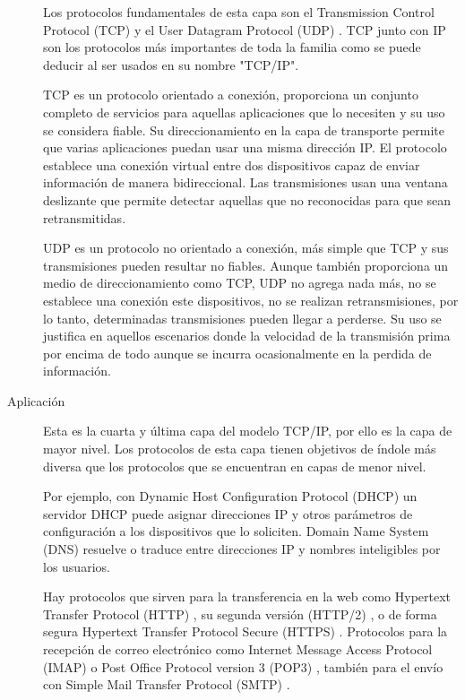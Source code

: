 \begin{description}
  Los protocolos fundamentales de esta capa son el Transmission Control Protocol
  (TCP) \cite{rfc793} y el User Datagram Protocol (UDP) \cite{rfc768}.
  TCP junto con IP son los protocolos más importantes de toda la familia como se
  puede deducir al ser usados en su nombre "TCP/IP".

  TCP es un protocolo orientado a conexión, proporciona un conjunto completo de
  servicios para aquellas aplicaciones que lo necesiten y su uso se considera
  fiable. Su direccionamiento en la capa de transporte permite que varias
  aplicaciones puedan usar una misma dirección IP. El protocolo establece una
  conexión virtual entre dos dispositivos capaz de enviar información de manera
  bidireccional. Las transmisiones usan una ventana deslizante que permite
  detectar aquellas que no reconocidas para que sean retransmitidas.

  UDP es un protocolo no orientado a conexión, más simple que TCP y sus
  transmisiones pueden resultar no fiables. Aunque también proporciona un medio
  de direccionamiento como TCP, UDP no agrega nada más, no se establece una
  conexión este dispositivos, no se realizan retransmisiones, por lo tanto,
  determinadas transmisiones pueden llegar a perderse. Su uso se justifica en
  aquellos escenarios donde la velocidad de la transmisión prima por encima de
  todo aunque se incurra ocasionalmente en la perdida de información.

  \item[Aplicación] Esta es la cuarta y última capa del modelo TCP/IP, por ello 
  es la capa de mayor nivel. Los protocolos de esta capa tienen objetivos de
  índole más diversa que los protocolos que se encuentran en capas de menor
  nivel.

  Por ejemplo, con Dynamic Host Configuration Protocol (DHCP) \cite{rfc2131}
  un servidor DHCP puede asignar direcciones IP y otros parámetros de
  configuración a los dispositivos que lo soliciten. Domain Name System (DNS)
  \cite{rfc1034} \cite{rfc1035} resuelve o traduce entre direcciones IP y
  nombres inteligibles por los usuarios.

  Hay protocolos que sirven para la transferencia en la web como Hypertext
  Transfer Protocol (HTTP) \cite{rfc7230}, su segunda versión (HTTP/2)
  \cite{rfc7540}, o de forma segura Hypertext Transfer Protocol Secure (HTTPS) 
  \cite{rfc2818}. Protocolos para la recepción de correo electrónico como
  Internet Message Access Protocol (IMAP) \cite{rfc3501} o Post Office
  Protocol version 3 (POP3) \cite{rfc1939}, también para el envío con
  Simple Mail Transfer Protocol (SMTP) \cite{rfc5321}.


\end{description}
